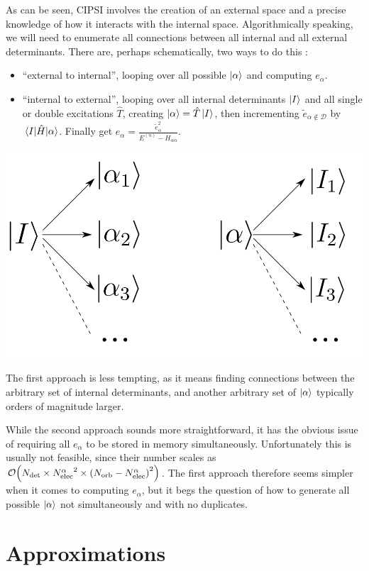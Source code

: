 \documentclass[./thesis.tex]{subfiles}
\begin{document}
As can be seen, CIPSI involves the creation of an external space and a precise knowledge of how it interacts with the internal space. Algorithmically speaking, we will need to enumerate all connections between all internal and all external determinants.
There are, perhaps schematically, two ways to do this :

\begin{itemize}
\item
``external to internal'', looping over all possible ${\ket{\alpha}}$ and computing $e_\alpha$.
\item
``internal to external'', looping over all internal determinants $\ket I$ and all single or double excitations $\hat T$, creating ${\ket{\alpha}} = \hat T \ket I$, then incrementing $\tilde e_{\alpha \notin \mathcal{D}}$ by $\mel{I}{\hat{H}}{\alpha}$. Finally get $e_{\alpha} = \frac{\tilde e_\alpha^2}{E^{(n)} - H_{\alpha \alpha}}$.
\end{itemize}

	\begin{center}
		\includegraphics[width=0.4\columnwidth]{figures/matrix_dressing/interactions}
	\end{center}

The first approach is less tempting, as it means finding connections between the arbitrary set of internal determinants, and another arbitrary set of ${\ket{\alpha}}$ typically orders of magnitude larger.

While the second approach sounds more straightforward, it has the obvious issue of requiring all $e_\alpha$ to be stored in memory simultaneously. Unfortunately this is usually not feasible, since their number scales as $\order{\Ndet \times \Nalpha^2 \times \qty(\Norb - \Nalpha)^2}$.
The first approach therefore seems simpler when it comes to computing $e_\alpha$, but it begs the question of how to generate all possible ${\ket{\alpha}}$ not simultaneously and with no duplicates. 


\section{Approximations}
\end{document}
